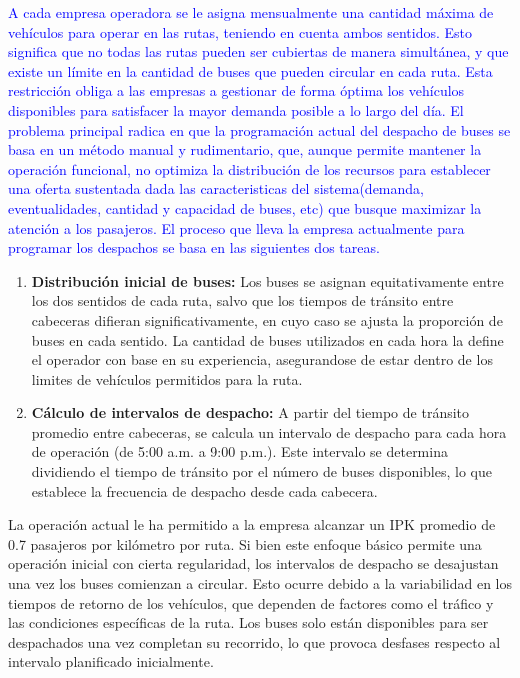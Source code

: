 \documentclass[preprint,11pt]{elsarticle}
\newcommand{\Blue}[1]{\textcolor{blue}{#1}}
\begin{document}
\Blue{A cada empresa operadora se le asigna mensualmente una cantidad máxima de vehículos para operar en las rutas, teniendo en cuenta ambos sentidos. Esto significa que no todas las rutas pueden ser cubiertas de manera simultánea, y que existe un límite en la cantidad de buses que pueden circular en cada ruta. Esta restricción obliga a las empresas a gestionar de forma óptima los vehículos disponibles para satisfacer la mayor demanda posible a lo largo del día. El problema principal radica en que la programación actual del despacho de buses se basa en un método manual y rudimentario, que, aunque permite mantener la operación funcional, no optimiza la distribución de los recursos para establecer una oferta sustentada dada las caracteristicas del sistema(demanda, eventualidades, cantidad y capacidad de buses, etc) que busque maximizar la atención a los pasajeros. El proceso que lleva la empresa actualmente para programar los despachos se basa en las siguientes dos tareas.}

\begin{enumerate}
    \item \textbf{Distribución inicial de buses:} Los buses se asignan equitativamente entre los dos sentidos de cada ruta, salvo que los tiempos de tránsito entre cabeceras difieran significativamente, en cuyo caso se ajusta la proporción de buses en cada sentido. La cantidad de buses utilizados en cada hora la define el operador con base en su experiencia, asegurandose de estar dentro de los limites de vehículos permitidos para la ruta.
    \item \textbf{Cálculo de intervalos de despacho:} A partir del tiempo de tránsito promedio entre cabeceras, se calcula un intervalo de despacho para cada hora de operación (de 5:00 a.m. a 9:00 p.m.). Este intervalo se determina dividiendo el tiempo de tránsito por el número de buses disponibles, lo que establece la frecuencia de despacho desde cada cabecera.
\end{enumerate}

La operación actual le ha permitido a la empresa alcanzar un IPK promedio de 0.7 pasajeros por kilómetro por ruta. Si bien este enfoque básico permite una operación inicial con cierta regularidad, los intervalos de despacho se desajustan una vez los buses comienzan a circular. Esto ocurre debido a la variabilidad en los tiempos de retorno de los vehículos, que dependen de factores como el tráfico y las condiciones específicas de la ruta. Los buses solo están disponibles para ser despachados una vez completan su recorrido, lo que provoca desfases respecto al intervalo planificado inicialmente.
\end{document}
